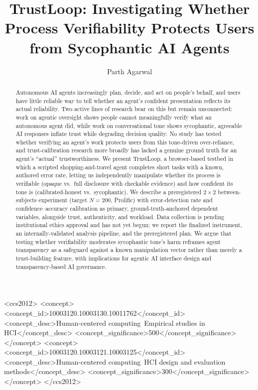 \documentclass[manuscript]{acmart}
\begin{document}
\title{TrustLoop: Investigating Whether Process Verifiability Protects Users from Sycophantic AI Agents}

\author{Parth Agarwal}

\newcommand{\ethicsref}{[ETHICS REFERENCE PENDING -- DO NOT SUBMIT WITHOUT THIS]}

\begin{abstract}
Autonomous AI agents increasingly plan, decide, and act on people's behalf, and users have little reliable way to tell whether an agent's confident presentation reflects its actual reliability. Two active lines of research bear on this but remain unconnected: work on agentic oversight shows people cannot meaningfully verify what an autonomous agent did, while work on conversational tone shows sycophantic, agreeable AI responses inflate trust while degrading decision quality. No study has tested whether verifying an agent's work protects users from this tone-driven over-reliance, and trust-calibration research more broadly has lacked a genuine ground truth for an agent's ``actual'' trustworthiness. We present TrustLoop, a browser-based testbed in which a scripted shopping-and-travel agent completes short tasks with a known, authored error rate, letting us independently manipulate whether its process is verifiable (opaque vs.\ full disclosure with checkable evidence) and how confident its tone is (calibrated-honest vs.\ sycophantic). We describe a preregistered $2\times2$ between-subjects experiment (target $N{=}200$, Prolific) with error-detection rate and confidence--accuracy calibration as primary, ground-truth-anchored dependent variables, alongside trust, authenticity, and workload. Data collection is pending institutional ethics approval and has not yet begun; we report the finalized instrument, an internally-validated analysis pipeline, and the preregistered plan. We argue that testing whether verifiability moderates sycophantic tone's harm reframes agent transparency as a safeguard against a known manipulation vector rather than merely a trust-building feature, with implications for agentic AI interface design and transparency-based AI governance.
\end{abstract}

\begin{CCSXML}
<ccs2012>
<concept>
<concept_id>10003120.10003130.10011762</concept_id>
<concept_desc>Human-centered computing~Empirical studies in HCI</concept_desc>
<concept_significance>500</concept_significance>
</concept>
<concept>
<concept_id>10003120.10003121.10003125</concept_id>
<concept_desc>Human-centered computing~HCI design and evaluation methods</concept_desc>
<concept_significance>300</concept_significance>
</concept>
</ccs2012>
\end{CCSXML}
\end{document}
